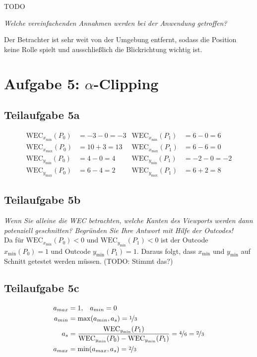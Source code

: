 \documentclass[a4paper]{scrartcl}
\begin{document}
TODO

\textit{Welche vereinfachenden Annahmen werden bei der Anwendung getroffen?}

Der Betrachter ist sehr weit von der Umgebung entfernt, sodass die Position
keine Rolle spielt und ausschließlich die Blickrichtung wichtig ist.


\section*{Aufgabe 5: $\alpha$-Clipping}
\subsection*{Teilaufgabe 5a}

\begin{align}
    \text{WEC}_{x_\text{min}}(P_0) &= -3-0 =-3 & \text{WEC}_{x_\text{min}}(P_1) &= 6-0 =6\\
    \text{WEC}_{x_\text{max}}(P_0) &= 10+3 =13 & \text{WEC}_{x_\text{max}}(P_1) &= 6-6 =0\\
    \text{WEC}_{y_\text{min}}(P_0) &= 4-0 = 4 & \text{WEC}_{y_\text{min}}(P_1) &= -2-0 =-2\\
    \text{WEC}_{y_\text{max}}(P_0) &= 6-4 = 2 & \text{WEC}_{y_\text{max}}(P_1) &= 6+2 =8
\end{align}

\goodbreak
\subsection*{Teilaufgabe 5b}
\textit{Wenn Sie alleine die WEC betrachten, welche Kanten des Viewports werden dann potenziell geschnitten? Begründen Sie Ihre Antwort mit Hilfe der Outcodes!}\\
Da für $\text{WEC}_{x_\text{min}}(P_0) < 0$ und $\text{WEC}_{y_\text{min}}(P_1) < 0$
ist der Outcode $x_\text{min}(P_0) = 1$ und Outcode $y_\text{min}(P_1) = 1$.
Daraus folgt, dass $x_\text{min}$ und $y_\text{min}$ auf Schnitt getestet
werden müssen. (TODO: Stimmt das?)

\subsection*{Teilaufgabe 5c}
\begin{align}
    a_{max} &= 1,\;\;\; a_{min} = 0\\
    a_{min} &= \max(a_{min}, a_s) = \nicefrac{1}{3}\\
    a_s &= \frac{\text{WEC}_{y_\text{min}}(P_1)}{\text{WEC}_{y_\text{min}}(P_0) - \text{WEC}_{y_\text{min}}(P_1)} = \nicefrac{4}{6} = \nicefrac{2}{3}\\
    a_{max} &= \min(a_{max}, a_s) = \nicefrac{2}{3}
\end{align}
\end{document}
